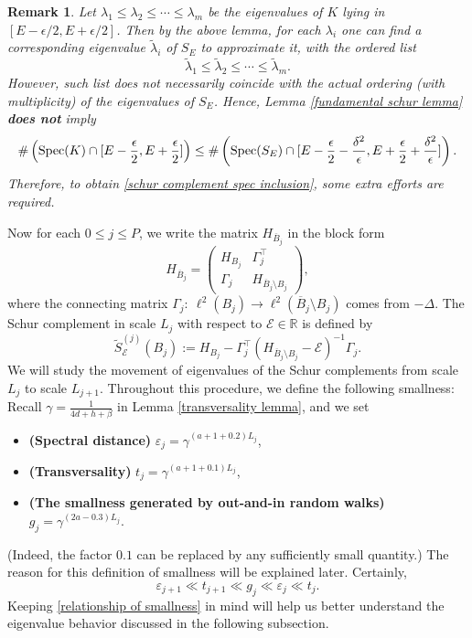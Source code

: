 \documentclass[11pt,reqno,UTF8,twoside]{amsart}
\newcommand{\R}{\mathbb{R}}
\newcommand{\spec}{{\rm Spec}}
\newcommand{\mcE}{\mathcal{E}}
\newcommand{\barB}{\overline{B}}
\newcommand{\wtSj}{\widetilde{S}^{(j)}}
\newtheorem{rmk}{\bf Remark}[section]
\theoremstyle{definition}
\numberwithin{equation}{section}
\begin{document}
\begin{rmk}\label{need additional orthonormal vector argument}
    Let \(\lambda_1 \leq \lambda_2 \leq \cdots \leq \lambda_m\) be the eigenvalues of \(K\) lying in \([E - \epsilon / 2, E + \epsilon / 2]\). 
    Then by the above lemma, for each $\lambda_i$ one can find a corresponding eigenvalue  $\tilde{\lambda}_i$ of $S_E$ to approximate it, with the ordered list 
    \[\tilde{\lambda}_1 \leq \tilde{\lambda}_2 \leq \cdots \leq \tilde{\lambda}_m .\]
    However, such list does not necessarily coincide with the actual ordering (with multiplicity) of the eigenvalues of $S_E$. Hence, Lemma \ref{fundamental schur lemma}  {\textbf{does not}}  imply 
    \begin{equation}\label{schur complement spec inclusion}
      \#\left(\spec(K)\cap [E-\frac{\epsilon}{2},E+\frac{\epsilon}{2}]\right) \leq \# \left( \spec(S_E) \cap [E-\frac{\epsilon}{2}-\frac{\delta^2}{\epsilon},E+\frac{\epsilon}{2}+\frac{\delta^2}{\epsilon}]\right) .
    \end{equation}
    Therefore, to obtain \eqref{schur complement spec inclusion},  some  extra efforts  are required.
\end{rmk}

Now for each $0\leq j\leq P$, we write the matrix $H_{\barB_j}$ in the block form
\[
H_{\barB_j} = \begin{pmatrix}
H_{B_j} & \Gamma_j ^{\top}\\
\Gamma_j & H_{\barB_j\setminus B_j}
\end{pmatrix},
\]
where the connecting matrix $\Gamma_j:\ \ell^2(B_j)\rightarrow \ell^2(\barB_j\setminus B_j)$ comes from  $-\Delta$. The Schur complement in scale $L_j$ with respect to $\mcE\in\R$ is defined by 
\begin{equation}\label{schur complement in j-step}
  \wtSj_\mcE(B_j):= H_{B_j}-\Gamma_j^{\top}(H_{\barB_j\setminus B_j}-\mcE)^{-1}\Gamma_j.
\end{equation}
We will study the movement of eigenvalues of the Schur complements from  scale $L_j$ to scale $L_{j+1}$. Throughout this procedure, we define the following smallness: Recall $\gamma=\frac{1}{4d+h+\beta}$ in Lemma \ref{transversality lemma}, and we set
\begin{itemize}
  \item \textbf{(Spectral distance)} $\varepsilon_j=   \gamma^{(a+1+0.2)L_j} $,
  \item \textbf{(Transversality)} $t_j=\gamma^{(a+1+0.1)L_j}$,
  \item \textbf{(The smallness generated by out-and-in random walks)} $g_j=\gamma^{(2a-0.3)L_j}$.
\end{itemize}
(Indeed, the factor $0.1$ can be replaced by any sufficiently small quantity.) The reason for this definition of smallness will be explained later.
Certainly,
\begin{equation}\label{relationship of smallness}
  \varepsilon_{j+1}\ll t_{j+1}\ll g_j \ll \varepsilon_j \ll t_j. 
\end{equation}
Keeping \eqref{relationship of smallness} in mind will help us better understand the eigenvalue behavior discussed in the following subsection.
\end{document}
